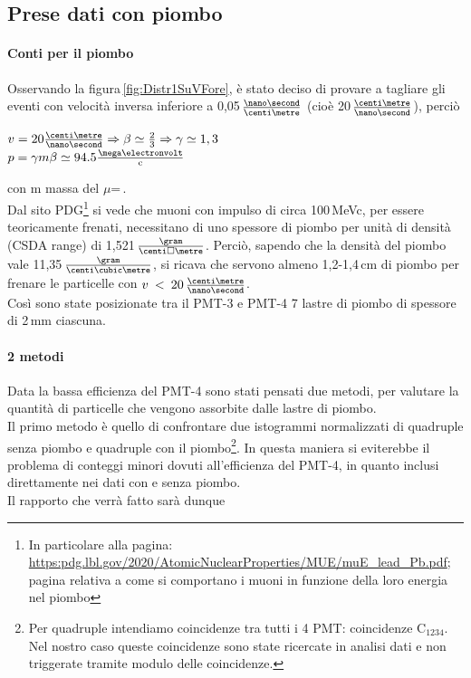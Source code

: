 \documentclass[a4paper,twocolumn]{article}
\begin{document}
\subsection{Prese dati con piombo}
\label{sec:RapportoU-N}
\paragraph{Conti per il piombo}
Osservando la figura\,\ref{fig:Distr1SuVFore}, è stato deciso di provare a tagliare gli eventi con velocità inversa inferiore a 0,05\,$\frac{\nano\second}{\centi\metre}$ (cioè 20\,$\frac{\centi\metre}{\nano\second}$),  perciò

\begin{center}
$v = 20\frac{\centi\metre}{\nano\second} \Rightarrow \beta \simeq \frac{2}{3} \Rightarrow \gamma \simeq 1,3$ \\ $ p=\gamma m \beta \simeq 94.5 \frac{\mega\electronvolt}{\textnormal{c}} $
\end{center}

con m massa del $\mu$\:=\,\mega\electronvolt\per{}.\\
Dal sito PDG\footnote{In particolare alla pagina: \url{https:pdg.lbl.gov/2020/AtomicNuclearProperties/MUE/muE_lead_Pb.pdf}; pagina relativa a come si comportano i muoni in funzione della loro energia nel piombo} si vede che muoni con impulso di circa 100\,MeV\per c, per essere teoricamente frenati, necessitano di uno spessore di piombo per unità di densità (CSDA range) di 1,521\,$\frac{\gram}{\centi\square\metre}$. Perciò, sapendo che la densità del piombo vale 11,35\,$\frac{\gram}{\centi\cubic\metre}$, si ricava che servono almeno 1,2-1,4\,cm di piombo per frenare le particelle con $v\:<\:20\,\frac{\centi\metre}{\nano\second}$.\\
Così sono state posizionate tra il PMT-3 e PMT-4 7 lastre di piombo di spessore di 2\,mm ciascuna.

\paragraph{2 metodi}
Data la bassa efficienza del PMT-4 sono stati pensati due metodi, per valutare la quantità di particelle che vengono assorbite dalle lastre di piombo.\\
Il primo metodo è quello di confrontare due istogrammi normalizzati di quadruple senza piombo e quadruple con il piombo\footnote{Per quadruple intendiamo coincidenze tra tutti i 4 PMT: coincidenze C$_{1234}$. Nel nostro caso queste coincidenze sono state ricercate in analisi dati e non triggerate tramite modulo delle coincidenze.}. In questa maniera si eviterebbe il problema di conteggi minori dovuti all'efficienza del PMT-4, in quanto inclusi direttamente nei dati con e senza piombo.\\
Il rapporto che verrà fatto sarà dunque
\end{document}
